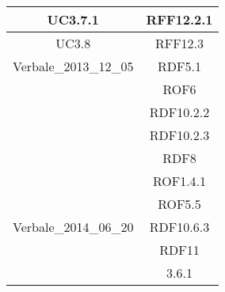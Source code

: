 \begin{longtable}{|c|c|}
\midrule
UC3.7.1
& RFF12.2.1\\

\midrule
UC3.8
& RFF12.3\\

\midrule
Verbale\_2013\_12\_05
& RDF5.1\\
& ROF6\\
& RDF10.2.2\\
& RDF10.2.3\\
& RDF8\\
& ROF1.4.1\\
& ROF5.5\\

\midrule
Verbale\_2014\_06\_20
& RDF10.6.3\\
& RDF11\\

\midrule



& 3.6.1\\

\end{longtable}



